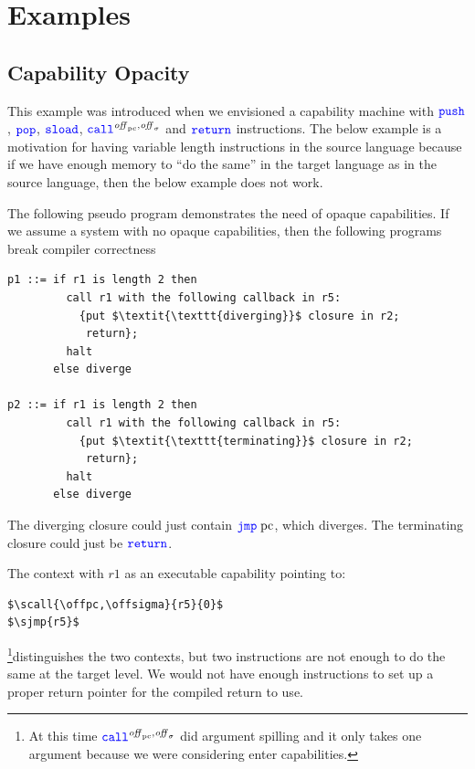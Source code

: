 \documentclass[a4paper]{article}
\begin{document}
\clearpage
\section{Examples}
\subsection{Capability Opacity}
\label{subsec:capability-opacity}

This example was introduced when we envisioned a capability machine with $\spush{}$, $\spop{}$, $\ssload{}{}$, $\scall{\offpc,\offsigma}{}{}$ and $\texttt{{\color{blue}return}}$ instructions. The below example is a motivation for having variable length instructions in the source language because if we have enough memory to ``do the same'' in the target language as in the source language, then the below example does not work.

The following pseudo program demonstrates the need of opaque capabilities. If we assume a system with no opaque capabilities, then the following programs break compiler correctness
\begin{lstlisting}[basicstyle=\sourcecolor{}\ttfamily] 
p1 ::= if r1 is length 2 then
         call r1 with the following callback in r5:
           {put $\textit{\texttt{diverging}}$ closure in r2;
            return};
         halt
       else diverge

p2 ::= if r1 is length 2 then
         call r1 with the following callback in r5:
           {put $\textit{\texttt{terminating}}$ closure in r2;
            return};
         halt
       else diverge
\end{lstlisting}
The diverging closure could just contain $\sjmp{\pcreg}$, which diverges. The terminating closure could just be $\texttt{{\color{blue}return}}$.

The context with $r1$ as an executable capability pointing to:
\begin{lstlisting}[basicstyle=\sourcecolor{}\ttfamily] 
$\scall{\offpc,\offsigma}{r5}{0}$
$\sjmp{r5}$
\end{lstlisting}
\footnote{At this time $\scall{\offpc,\offsigma}{}{}$ did argument spilling and it only takes one argument because we were considering enter capabilities.}distinguishes the two contexts, but two instructions are not enough to do the same at the target level. We would not have enough instructions to set up a proper return pointer for the compiled return to use.
\end{document}
